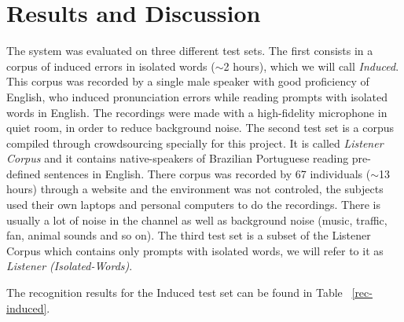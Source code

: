 \documentclass[twocolumn]{bmcart}%
\begin{document}
\section*{Results and Discussion}

The system was evaluated on three different test sets. The first consists in a corpus of induced errors in isolated words ($\sim$2 hours), which we will call \emph{Induced}. This corpus was recorded by a single male speaker with good proficiency of English, who induced pronunciation errors while reading prompts with isolated words in English. The recordings were made with a high-fidelity microphone in quiet room, in order to reduce background noise. The second test set is a corpus compiled through crowdsourcing specially for this project. It is called \emph{Listener Corpus} and it contains native-speakers of Brazilian Portuguese reading pre-defined sentences in English. There corpus was recorded by 67 individuals ($\sim$13 hours) through a website and the environment was not controled, the subjects used their own laptops and personal computers to do the recordings. There is usually a lot of noise in the channel as well as background noise (music, traffic, fan, animal sounds and so on). The third test set is a subset of the Listener Corpus which contains only prompts with isolated words, we will refer to it as \emph{Listener (Isolated-Words)}.

The recognition results for the Induced test set can be found in Table ~\ref{rec-induced}.
\end{document}
